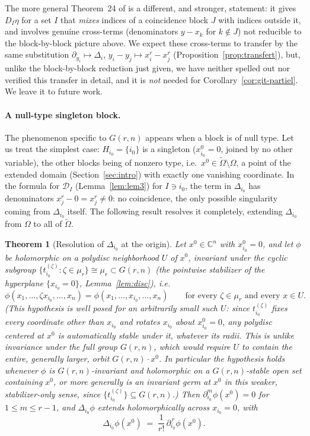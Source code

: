 \documentclass[10pt,a4paper]{amsart}
\newtheorem{theorem}{Theorem}[section]
\newcommand{\CC}{\mathbb{C}}
\begin{document}
The more general Theorem~24 of \cite{Ze} is a different, and stronger, statement: it gives $D_I\eta$ for a set $I$ that \emph{mixes} indices of a coincidence block $J$ with indices outside it, and involves genuine cross-terms (denominators $y-x_k$ for $k\notin J$) not reducible to the block-by-block picture above. We expect these cross-terms to transfer by the same substitution $\partial_{y_i}\mapsto\Delta_i$, $y_i-y_j\mapsto x_i^r-x_j^r$ (Proposition~\ref{prop:transfert}), but, unlike the block-by-block reduction just given, we have neither spelled out nor verified this transfer in detail, and it is \emph{not} needed for Corollary~\ref{cor:git-partiel}. We leave it to future work.

\paragraph{A null-type singleton block.} The phenomenon specific to $G(r,n)$ appears when a block is of null type. Let us treat the simplest case: $H_{i_0}=\{i_0\}$ is a singleton ($x_{i_0}^0=0$, joined by no other variable), the other blocks being of nonzero type, i.e.\ $x^0\in\widetilde\Omega\setminus\Omega$, a point of the extended domain (Section~\ref{sec:intro}) with exactly one vanishing coordinate. In the formula for $\mathcal D_I$ (Lemma~\ref{lem:lem3}) for $I\ni i_0$, the term in $\Delta_{i_0}$ has denominators $x_j^r-0=x_j^r\ne0$: no coincidence, the only possible singularity coming from $\Delta_{i_0}$ itself. The following result resolves it completely, extending $\Delta_{i_0}$ from $\Omega$ to all of $\widetilde\Omega$.


\begin{theorem}[Resolution of $\Delta_{i_0}$ at the origin]\label{thm:origine}
Let $x^0\in\CC^n$ with $x_{i_0}^0=0$, and let $\phi$ be holomorphic on a polydisc neighborhood $U$ of $x^0$, invariant under the cyclic subgroup $\{t_{i_0}^{(\zeta)}:\zeta\in\mu_r\}\cong\mu_r\subset G(r,n)$ (the pointwise stabilizer of the hyperplane $\{x_{i_0}=0\}$, Lemma~\ref{lem:disc}), i.e.
\[
\phi(x_1,\dots,\zeta x_{i_0},\dots,x_n) = \phi(x_1,\dots,x_{i_0},\dots,x_n) \qquad \text{for every } \zeta\in\mu_r \text{ and every } x\in U.
\]
(This hypothesis is well posed for an \emph{arbitrarily small} such $U$: since $t_{i_0}^{(\zeta)}$ fixes every coordinate other than $x_{i_0}$ and rotates $x_{i_0}$ about $x_{i_0}^0=0$, any polydisc centered at $x^0$ is automatically stable under it, whatever its radii. This is unlike invariance under the \emph{full} group $G(r,n)$, which would require $U$ to contain the entire, generally larger, orbit $G(r,n)\cdot x^0$. In particular the hypothesis holds whenever $\phi$ is $G(r,n)$-invariant and holomorphic on a $G(r,n)$-stable open set containing $x^0$, or more generally is an invariant germ at $x^0$ in this weaker, stabilizer-only sense, since $\{t_{i_0}^{(\zeta)}\}\subseteq G(r,n)$.) Then $\partial_{i_0}^m\phi(x^0)=0$ for $1\le m\le r-1$, and $\Delta_{i_0}\phi$ extends holomorphically across $x_{i_0}=0$, with
\[
\Delta_{i_0}\phi(x^0) \;=\; \frac{1}{r!}\,\partial_{i_0}^{\,r}\phi(x^0).
\]
\end{theorem}
\end{document}
